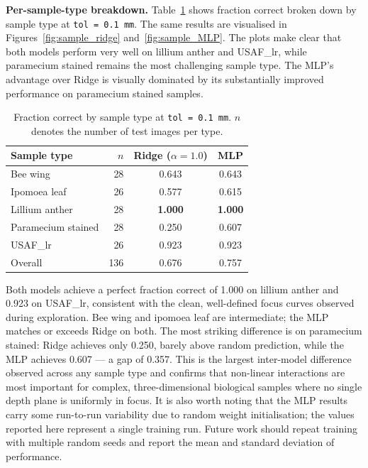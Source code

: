 \documentclass{article}
\begin{document}
\textbf{Per-sample-type breakdown.} Table~\ref{tab:per_type} shows fraction correct broken down by sample type at \texttt{tol = 0.1\,mm}. The same results are visualised in Figures~\ref{fig:sample_ridge} and~\ref{fig:sample_MLP}. The plots make clear that both models perform very well on lillium anther and USAF\_lr, while paramecium stained remains the most challenging sample type. The MLP's advantage over Ridge is visually dominated by its substantially improved performance on paramecium stained samples.

\begin{table}[htbp]
    \centering
    \caption{Fraction correct by sample type at \texttt{tol = 0.1\,mm}. $n$ denotes the number of test images per type.}
    \begin{tabular}{lrcc}
        \toprule
        Sample type & $n$ & Ridge ($\alpha = 1.0$) & MLP \\
        \midrule
        Bee wing           & 28 & 0.643 & 0.643 \\
        Ipomoea leaf       & 26 & 0.577 & 0.615 \\
        Lillium anther     & 28 & \textbf{1.000} & \textbf{1.000} \\
        Paramecium stained & 28 & 0.250 & 0.607 \\
        USAF\_lr           & 26 & 0.923 & 0.923 \\
        \midrule
        Overall            & 136 & 0.676 & 0.757 \\
        \bottomrule
    \end{tabular}
    \label{tab:per_type}
\end{table}

Both models achieve a perfect fraction correct of 1.000 on lillium anther and 0.923 on USAF\_lr, consistent with the clean, well-defined focus curves observed during exploration. Bee wing and ipomoea leaf are intermediate; the MLP matches or exceeds Ridge on both. The most striking difference is on paramecium stained: Ridge achieves only 0.250, barely above random prediction, while the MLP achieves 0.607 --- a gap of 0.357. This is the largest inter-model difference observed across any sample type and confirms that non-linear interactions are most important for complex, three-dimensional biological samples where no single depth plane is uniformly in focus. It is also worth noting that the MLP results carry some run-to-run variability due to random weight initialisation; the values reported here represent a single training run. Future work should repeat training with multiple random seeds and report the mean and standard deviation of performance.
\end{document}
